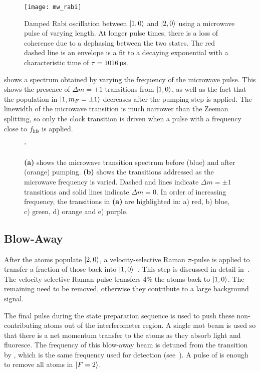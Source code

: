 \begin{figure}[!htbp]
    \centering
    \texttt{[image: mw\_rabi]}
    \caption[Microwave Rabi oscillation between \(\ket{1,0}\) and \(\ket{2,0}\)]{Damped Rabi oscillation between \(\ket{1,0}\) and \(\ket{2,0}\) using a microwave pulse of varying length. At longer pulse times, there is a loss of coherence due to a dephasing between the two states. The red dashed line is an envelope is a fit to a decaying exponential with a characteristic time of \(\tau = \sivalue{1016}{\micro\second}\).}
    \label{fig:mw_rabi}
\end{figure}
\par\noindent
{} shows a spectrum obtained by
varying the frequency of the microwave pulse. This shows the presence
of \(\Delta m = \pm 1 \) transitions from \(\ket{1,0}\), as well as
the fact that the population in \(\ket{1,m_F=\pm 1}\) decreases after
the  pumping step is applied. The linewidth of the
microwave transition is much narrower than the Zeeman splitting, so
only the clock transition is driven when a pulse with a frequency
close to \(f_\text{hfs}\) is applied.
\begin{figure}[!htbp]
    \centering
    \def\svgwidth{\columnwidth}
    \fontsize{14pt}{14pt}
    \subfloat[][]{\scalebox{0.5}{}\label{fig:microwave_spectrum}}
    \subfloat[][]{\scalebox{0.5}{\raisebox{4ex}{}}}
    \caption[Microwave transition spectrum]{\textbf{(a)} shows the
      microwave transition spectrum before (blue) and after (orange)
     pumping. \textbf{(b)} shows the transitions addressed
  as the microwave frequency is varied. Dashed and lines indicate
\(\Delta m = \pm 1\) transitions and solid lines indicate \(\Delta m =
0\). In order of increasing frequency, the transitions in \textbf{(a)} are highlighted in: a) red, b) blue, c) green, d) orange and e) purple.} 
    \label{fig:microwave_data}'
\end{figure}

\subsection{Blow-Away}\label{subsec:blow_away}
After the atoms populate \(\ket{2,0}\), a velocity-selective Raman
\(\pi\)-pulse is applied to transfer a fraction of those back into
\(\ket{1,0}\)~\cite{Kasevich1991a}. This step is discussed in detail
in~. The velocity-selective Raman pulse
transfers 4\% the atoms
back to \(\ket{1,0}\). The remaining need to be removed, otherwise
they contribute to a large background signal. \par\noindent
The final pulse during the state preparation sequence is used to push
these non-contributing atoms out of the interferometer region. A
single \ac{mot} beam is used so that there is a net momentum transfer
to the atoms as they absorb light and fluoresce. The frequency of this
blow-away beam is detuned from the  transition by
, which is the same frequency used for
detection (see~). A pulse of
 is enough to remove all atoms in
\(\ket{F=2}\). 

